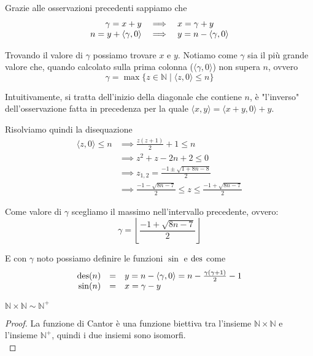 Grazie alle osservazioni precedenti sappiamo che
$$ \begin{array}{r c l}
	\gamma = x + y & \implies & x = \gamma + y \\
	n = y + \langle \gamma , 0 \rangle & \implies & y = n - \langle \gamma , 0 \rangle \\
\end{array} $$

Trovando il valore di $\gamma$ possiamo trovare $x$ e $y$. Notiamo come $\gamma$ sia il più grande valore che, quando calcolato sulla prima colonna ($\langle \gamma, 0 \rangle$) non supera $n$, ovvero
$$ \gamma = \max \{z \in \mathbb{N} \mid \langle z, 0 \rangle \leq n \} $$

Intuitivamente, si tratta dell'inizio della diagonale che contiene $n$, è "l'inverso" dell'osservazione fatta in precedenza per la quale $ \langle x,y \rangle = \langle x + y,0 \rangle + y $.

Risolviamo quindi la disequazione
\begin{align*}
	\langle z, 0 \rangle \leq n & \implies \frac{z(z+1)}{2} + 1 \leq n \\
	& \implies z^2 + z - 2n + 2 \leq 0 \\
	& \implies z_{1,2} = \frac{-1 \pm \sqrt{1 + 8n - 8}}{2} \\
	& \implies \frac{-1 - \sqrt{8n - 7}}{2} \leq z \leq \frac{-1 + \sqrt{8n - 7}}{2} 
\end{align*}

Come valore di $\gamma$ scegliamo il massimo nell'intervallo precedente, ovvero:
$$ \gamma = \left\lfloor \frac{-1 + \sqrt{8n - 7}}{2} \right\rfloor $$

E con $\gamma$ noto possiamo definire le funzioni $\sin$ e $\operatorname{des}$ come
$$ 
\begin{array}{r c l}
	\operatorname{des}(n) & = & y = n - \langle \gamma, 0 \rangle = n - \frac{\gamma (\gamma + 1)}{2} - 1 \\
	\sin (n) & = & x = \gamma - y
\end{array}
$$

\begin{theor}
	$\mathbb{N} \times \mathbb{N} \sim \mathbb{N}^+$
\end{theor}
\begin{proof}
	La funzione di Cantor è una funzione biettiva tra l'insieme $\mathbb{N} \times \mathbb{N}$ e l'insieme $\mathbb{N}^+$, quindi i due insiemi sono isomorfi. \\
\end{proof}

